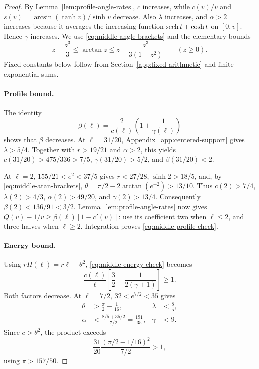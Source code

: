 \begin{proof}
By Lemma~\ref{lem:profile-angle-rates}, \(c\) increases, while
\(c(v)/v\) and \(s(v)=\arcsin(\tanh v)/\sinh v\) decrease.
Also \(\lambda\) increases, and \(\alpha>2\) increases because it
averages the increasing function \(\operatorname{sech} t+\cosh t\) on \([0,v]\).
Hence \(\gamma\) increases. We use \eqref{eq:middle-angle-brackets}
and the elementary bounds
\begin{equation}
 z-\frac{z^3}{3}\le\arctan z
 \le z-\frac{z^3}{3(1+z^2)}\qquad(z\ge0).
 \label{eq:middle-atan-brackets}
\end{equation}
Fixed constants below follow from
Section~\ref{app:fixed-arithmetic} and finite exponential sums.

\paragraph{Profile bound.}
The identity
\[
 \beta(\ell)=\frac{2}{c(\ell)}\left(1+\frac1{\gamma(\ell)}\right)
\]
shows that \(\beta\) decreases. At \(\ell=31/20\),
Appendix~\ref{app:centered-support} gives \(\lambda>5/4\).
Together with \(r>19/21\) and \(\alpha>2\), this yields
\(c(31/20)>475/336>7/5\), \(\gamma(31/20)>5/2\), and
\(\beta(31/20)<2\).

At \(\ell=2\), \(155/21<e^2<37/5\) gives
\(r<27/28\), \(\sinh2>18/5\), and, by
\eqref{eq:middle-atan-brackets},
\(\theta=\pi/2-2\arctan(e^{-2})>13/10\).
Thus \(c(2)>7/4\), \(\lambda(2)>4/3\),
\(\alpha(2)>49/20\), and \(\gamma(2)>13/4\). Consequently
\(\beta(2)<136/91<3/2\).
Lemma~\ref{lem:profile-angle-rates} now gives
\(Q(v)-1/v\ge\beta(\ell)[1-c'(v)]\): use its coefficient two
when \(\ell\le2\), and three halves when \(\ell\ge2\).
Integration proves \eqref{eq:middle-profile-check}.

\paragraph{Energy bound.}
Using \(rH(\ell)=r\ell-\theta^2\),
\eqref{eq:middle-energy-check} becomes
\[
 \frac{c(\ell)}{\ell}
       \left[\frac32+\frac1{2(\gamma+1)}\right]\ge1.
\]
Both factors decrease. At \(\ell=7/2\), \(32<e^{7/2}<35\) gives
\begin{align*}
 \theta&>\frac\pi2-\frac1{16},& \lambda&<\frac85,\\
 \alpha&<\frac{8/5+35/2}{7/2}=\frac{191}{35},& \gamma&<9.
\end{align*}
Since \(c>\theta^2\), the product exceeds
\[
 \frac{31}{20}\frac{(\pi/2-1/16)^2}{7/2}>1,
\]
using \(\pi>157/50\).


\end{proof}
